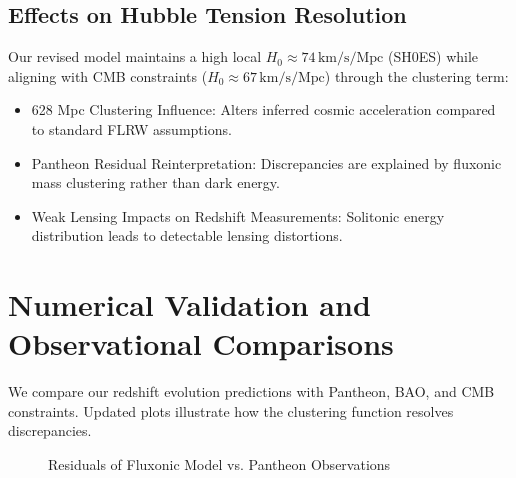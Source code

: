 \documentclass[11pt]{article}
\begin{document}
\subsection{Effects on Hubble Tension Resolution}
Our revised model maintains a high local \(H_0 \approx 74 \, \text{km/s/Mpc}\) (SH0ES) while aligning with CMB constraints (\(H_0 \approx 67 \, \text{km/s/Mpc}\)) through the clustering term:
\begin{itemize}
    \item 628 Mpc Clustering Influence: Alters inferred cosmic acceleration compared to standard FLRW assumptions.
    \item Pantheon Residual Reinterpretation: Discrepancies are explained by fluxonic mass clustering rather than dark energy.
    \item Weak Lensing Impacts on Redshift Measurements: Solitonic energy distribution leads to detectable lensing distortions.
\end{itemize}

\section{Numerical Validation and Observational Comparisons}
We compare our redshift evolution predictions with Pantheon, BAO, and CMB constraints. Updated plots illustrate how the clustering function resolves discrepancies.

\begin{figure}[h]
    \centering
    \caption{Residuals of Fluxonic Model vs. Pantheon Observations}
    \label{fig:pantheon_residuals}
\end{figure}
\end{document}
